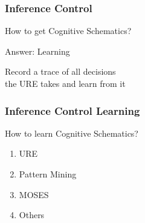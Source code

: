 \documentclass{beamer}
\begin{document}
\begin{frame}
  \frametitle{Inference Control}

  How to get Cognitive Schematics?

  Answer: \alert{Learning}

  \begin{center}
    Record a \alert{trace} of all decisions\\
    the URE takes and \alert{learn} from it
  \end{center}
\end{frame}

\begin{frame}
  \frametitle{Inference Control Learning}

  How to learn Cognitive Schematics?
  
  \begin{enumerate}
  \item URE
  \item Pattern Mining
  \item MOSES
  \item Others
  \end{enumerate}

\end{frame}
\end{document}
